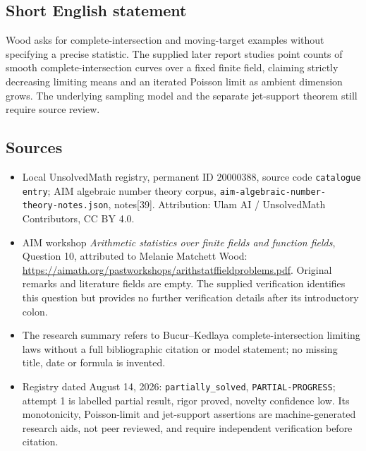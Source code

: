 \documentclass[11pt]{article}
\begin{document}
\subsection{Short English statement}
Wood asks for complete-intersection and moving-target examples without specifying a precise statistic. The supplied later report studies point counts of smooth complete-intersection curves over a fixed finite field, claiming strictly decreasing limiting means and an iterated Poisson limit as ambient dimension grows. The underlying sampling model and the separate jet-support theorem still require source review.
\subsection{Sources}
\begin{itemize}
\item Local UnsolvedMath registry, permanent ID \(20000388\), source code \texttt{catalogue entry}; AIM algebraic number theory corpus, \texttt{aim-algebraic-number-theory-notes.json}, notes[39]. Attribution: Ulam AI / UnsolvedMath Contributors, CC BY 4.0.
\item AIM workshop \emph{Arithmetic statistics over finite fields and function fields}, Question 10, attributed to Melanie Matchett Wood: \url{https://aimath.org/pastworkshops/arithstatffieldproblems.pdf}. Original remarks and literature fields are empty. The supplied verification identifies this question but provides no further verification details after its introductory colon.
\item The research summary refers to Bucur--Kedlaya complete-intersection limiting laws without a full bibliographic citation or model statement; no missing title, date or formula is invented.
\item Registry dated August 14, 2026: \texttt{partially\_solved}, \texttt{PARTIAL-PROGRESS}; attempt 1 is labelled partial result, rigor proved, novelty confidence low. Its monotonicity, Poisson-limit and jet-support assertions are machine-generated research aids, not peer reviewed, and require independent verification before citation.
\end{itemize}
\end{document}
